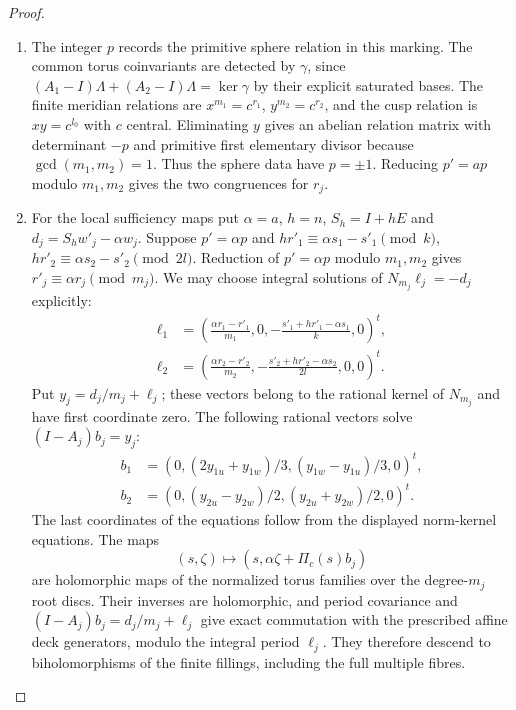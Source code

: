 \begin{proof}
\begin{enumerate}[label=\arabic*.,leftmargin=*]
\item The integer $p$ records the primitive sphere relation in this marking. The common torus coinvariants are detected by $\gamma$, since $(A_1-I)\Lambda+(A_2-I)\Lambda=\ker\gamma$ by their explicit saturated bases. The finite meridian relations are $x^{m_1}=c^{r_1}$, $y^{m_2}=c^{r_2}$, and the cusp relation is $xy=c^{l_0}$ with $c$ central. Eliminating $y$ gives an abelian relation matrix with determinant $-p$ and primitive first elementary divisor because $\gcd(m_1,m_2)=1$. Thus the sphere data have $p=\pm1$. Reducing $p'=ap$ modulo $m_1,m_2$ gives the two congruences for $r_j$.

\item For the local sufficiency maps put $\alpha=a$, $h=n$,
$S_h=I+hE$ and $d_j=S_hw'_j-\alpha w_j$.
Suppose $p'=\alpha p$ and
$hr'_1\equiv\alpha s_1-s'_1\pmod k$,
$hr'_2\equiv\alpha s_2-s'_2\pmod{2l}$.
Reduction of $p'=\alpha p$ modulo $m_1,m_2$ gives
$r'_j\equiv\alpha r_j\pmod{m_j}$.
We may choose integral solutions of $N_{m_j}\ell_j=-d_j$ explicitly:
\[
 \begin{split}
 \ell_1&=\left(\frac{\alpha r_1-r'_1}{m_1},0,
 -\frac{s'_1+hr'_1-\alpha s_1}{k},0\right)^t,\\
 \ell_2&=\left(\frac{\alpha r_2-r'_2}{m_2},
 -\frac{s'_2+hr'_2-\alpha s_2}{2l},0,0\right)^t.
 \end{split}
\]
Put $y_j=d_j/m_j+\ell_j$; these vectors belong to the rational
kernel of $N_{m_j}$ and have first coordinate zero.
The following rational vectors solve $(I-A_j)b_j=y_j$:
\[
 \begin{split}
 b_1&=(0,(2y_{1u}+y_{1w})/3,(y_{1w}-y_{1u})/3,0)^t,\\
 b_2&=(0,(y_{2u}-y_{2w})/2,(y_{2u}+y_{2w})/2,0)^t.
 \end{split}
\]
The last coordinates of the equations follow from the displayed
norm-kernel equations.  The maps
\[
 (s,\zeta)\longmapsto(s,\alpha\zeta+\Pi_c(s)b_j)
\]
are holomorphic maps of the normalized torus families over the
degree-$m_j$ root discs.  Their inverses are holomorphic, and period
covariance and $(I-A_j)b_j=d_j/m_j+\ell_j$ give exact commutation
with the prescribed affine deck generators, modulo the integral
period $\ell_j$.  They therefore descend to biholomorphisms of the
finite fillings, including the full multiple fibres.


\end{enumerate}
\end{proof}
